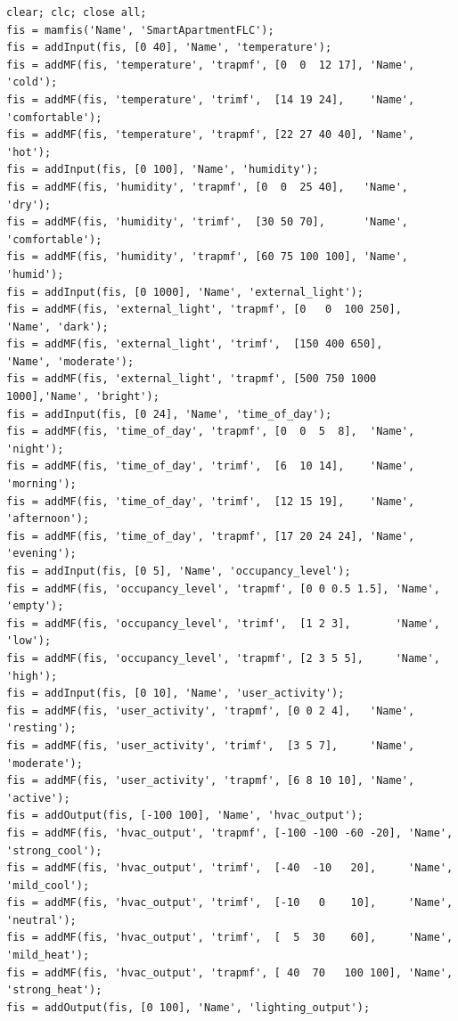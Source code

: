 \documentclass[10pt,twocolumn,a4paper]{article}
\begin{document}
\lstset{style=matlab}
\begin{lstlisting}[caption={Part 1: Mamdani FLC construction, MF definition, rule base, control surfaces, and 24-hour simulation.}]
clear; clc; close all;
fis = mamfis('Name', 'SmartApartmentFLC');
fis = addInput(fis, [0 40], 'Name', 'temperature');
fis = addMF(fis, 'temperature', 'trapmf', [0  0  12 17], 'Name', 'cold');
fis = addMF(fis, 'temperature', 'trimf',  [14 19 24],    'Name', 'comfortable');
fis = addMF(fis, 'temperature', 'trapmf', [22 27 40 40], 'Name', 'hot');
fis = addInput(fis, [0 100], 'Name', 'humidity');
fis = addMF(fis, 'humidity', 'trapmf', [0  0  25 40],   'Name', 'dry');
fis = addMF(fis, 'humidity', 'trimf',  [30 50 70],      'Name', 'comfortable');
fis = addMF(fis, 'humidity', 'trapmf', [60 75 100 100], 'Name', 'humid');
fis = addInput(fis, [0 1000], 'Name', 'external_light');
fis = addMF(fis, 'external_light', 'trapmf', [0   0  100 250],   'Name', 'dark');
fis = addMF(fis, 'external_light', 'trimf',  [150 400 650],      'Name', 'moderate');
fis = addMF(fis, 'external_light', 'trapmf', [500 750 1000 1000],'Name', 'bright');
fis = addInput(fis, [0 24], 'Name', 'time_of_day');
fis = addMF(fis, 'time_of_day', 'trapmf', [0  0  5  8],  'Name', 'night');
fis = addMF(fis, 'time_of_day', 'trimf',  [6  10 14],    'Name', 'morning');
fis = addMF(fis, 'time_of_day', 'trimf',  [12 15 19],    'Name', 'afternoon');
fis = addMF(fis, 'time_of_day', 'trapmf', [17 20 24 24], 'Name', 'evening');
fis = addInput(fis, [0 5], 'Name', 'occupancy_level');
fis = addMF(fis, 'occupancy_level', 'trapmf', [0 0 0.5 1.5], 'Name', 'empty');
fis = addMF(fis, 'occupancy_level', 'trimf',  [1 2 3],       'Name', 'low');
fis = addMF(fis, 'occupancy_level', 'trapmf', [2 3 5 5],     'Name', 'high');
fis = addInput(fis, [0 10], 'Name', 'user_activity');
fis = addMF(fis, 'user_activity', 'trapmf', [0 0 2 4],   'Name', 'resting');
fis = addMF(fis, 'user_activity', 'trimf',  [3 5 7],     'Name', 'moderate');
fis = addMF(fis, 'user_activity', 'trapmf', [6 8 10 10], 'Name', 'active');
fis = addOutput(fis, [-100 100], 'Name', 'hvac_output');
fis = addMF(fis, 'hvac_output', 'trapmf', [-100 -100 -60 -20], 'Name', 'strong_cool');
fis = addMF(fis, 'hvac_output', 'trimf',  [-40  -10   20],     'Name', 'mild_cool');
fis = addMF(fis, 'hvac_output', 'trimf',  [-10   0    10],     'Name', 'neutral');
fis = addMF(fis, 'hvac_output', 'trimf',  [  5  30    60],     'Name', 'mild_heat');
fis = addMF(fis, 'hvac_output', 'trapmf', [ 40  70   100 100], 'Name', 'strong_heat');
fis = addOutput(fis, [0 100], 'Name', 'lighting_output');

\end{lstlisting}
\end{document}
